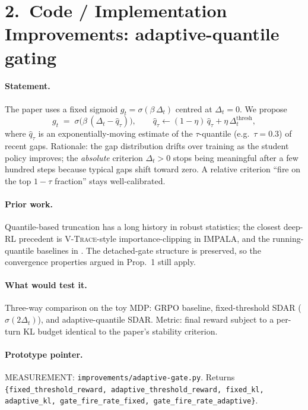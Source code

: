 \documentclass[11pt]{article}
\begin{document}
\section*{2.\ Code / Implementation Improvements: adaptive-quantile gating}

\paragraph{Statement.}  The paper uses a fixed sigmoid
$g_t = \sigma(\beta\,\Delta_t)$ centred at $\Delta_t = 0$.  We propose
\[
   g_t \;=\; \sigma\bigl(\beta\,(\Delta_t - \hat q_\tau)\bigr),
   \qquad
   \hat q_\tau \leftarrow (1-\eta)\,\hat q_\tau + \eta\,\Delta_t^{\text{thresh}},
\]
where $\hat q_\tau$ is an exponentially-moving estimate of the
$\tau$-quantile (e.g.\ $\tau=0.3$) of recent gaps.  Rationale: the gap
distribution drifts over training as the student policy improves; the
\emph{absolute} criterion $\Delta_t > 0$ stops being meaningful after a few
hundred steps because typical gaps shift toward zero.  A relative criterion
``fire on the top $1\!-\!\tau$ fraction'' stays well-calibrated.

\paragraph{Prior work.}  Quantile-based truncation has a long history in
robust statistics; the closest deep-RL precedent is
\textsc{V-Trace}-style importance-clipping in IMPALA, and the
running-quantile baselines in \citet{wang2026tcod}.  The detached-gate
structure is preserved, so the convergence properties argued in Prop.~1
still apply.

\paragraph{What would test it.}  Three-way comparison on the toy MDP:
GRPO baseline, fixed-threshold SDAR ($\sigma(2\Delta_t)$), and
adaptive-quantile SDAR.  Metric: final reward subject to a per-turn KL
budget identical to the paper's stability criterion.

\paragraph{Prototype pointer.}  MEASUREMENT:
\texttt{improvements/adaptive-gate.py}.  Returns
\verb|{fixed_threshold_reward, adaptive_threshold_reward, fixed_kl,|
\verb|adaptive_kl, gate_fire_rate_fixed, gate_fire_rate_adaptive}|.
\end{document}
